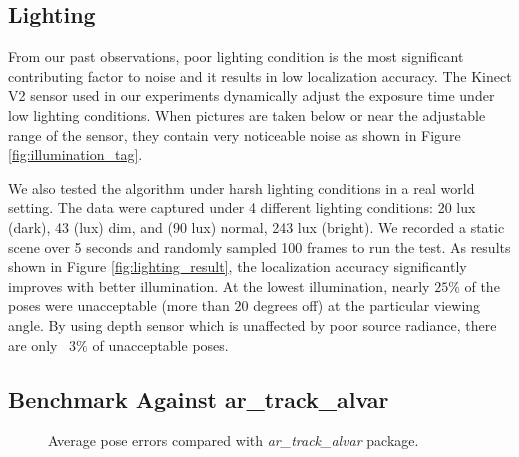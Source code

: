 \subsection{Lighting}

From our past observations, poor lighting condition is the most significant contributing factor to noise and it results in low localization accuracy. The Kinect V2 sensor used in our experiments dynamically adjust the exposure time under low lighting conditions. When pictures are taken below or near the adjustable range of the sensor, they contain very noticeable noise as shown in Figure \ref{fig:illumination_tag}.

We also tested the algorithm under harsh lighting conditions in a real world setting. The data were captured under 4 different lighting conditions: 20 lux (dark), 43 (lux) dim, and (90 lux) normal, 243 lux (bright). We recorded a static scene over 5 seconds and randomly sampled 100 frames to run the test.  As results shown in Figure \ref{fig:lighting_result}, the localization accuracy significantly improves with better illumination. At the lowest illumination, nearly $25\%$ of the poses were unacceptable (more than $20$ degrees off) at the particular viewing angle. By using depth sensor which is unaffected by poor source radiance, there are only ~$3\%$ of unacceptable poses.

\subsection{Benchmark Against ar\_track\_alvar}

\begin{figure}
\centering
{}
\caption{Average pose errors compared with \textit{ar\_track\_alvar} package.}
\label{fig:alvartrack}
\end{figure}

